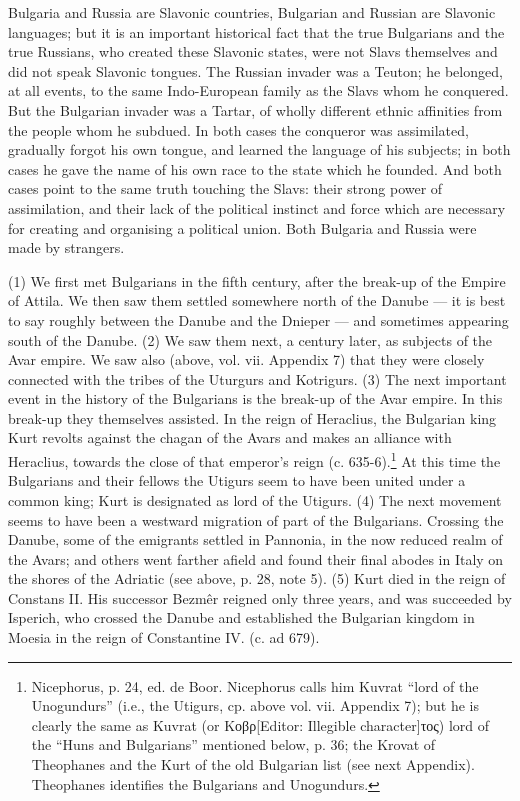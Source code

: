 
Bulgaria and Russia are Slavonic countries, Bulgarian and Russian are Slavonic languages; but it is an important historical fact that the true Bulgarians and the true Russians, who created these Slavonic states, were not Slavs themselves and did not speak Slavonic tongues. The Russian invader was a Teuton; he belonged, at all events, to the same Indo-European family as the Slavs whom he conquered. But the Bulgarian invader was a Tartar, of wholly different ethnic affinities from the people whom he subdued. In both cases the conqueror was assimilated, gradually forgot his own tongue, and learned the language of his subjects; in both cases he gave the name of his own race to the state which he founded. And both cases point to the same truth touching the Slavs: their strong power of assimilation, and their lack of the political instinct and force which are necessary for creating and organising a political union. Both Bulgaria and Russia were made by strangers.

(1) We first met Bulgarians in the fifth century, after the break-up of the Empire of Attila. We then saw them settled somewhere north of the Danube \texthebrew{—} it is best to say roughly between the Danube and the Dnieper \texthebrew{—} and sometimes appearing south of the Danube. (2) We saw them next, a century later, as subjects of the Avar empire. We saw also (above, vol. vii. Appendix 7) that they were closely connected with the tribes of the Uturgurs and Kotrigurs. (3) The next important event in the history of the Bulgarians is the break-up of the Avar empire. In this break-up they themselves assisted. In the reign of Heraclius, the Bulgarian king Kurt revolts against the chagan of the Avars and makes an alliance with Heraclius, towards the close of that emperor\texthebrew{}’s reign (c. 635-6).\footnote{Nicephorus, p. 24, ed. de Boor. Nicephorus calls him Kuvrat \texthebrew{“}lord of the Unogundurs\texthebrew{}” (i.e., the Utigurs, cp. above vol. vii. Appendix 7); but he is clearly the same as Kuvrat (or \textgreek{Κοβρ}[Editor: Illegible character]\textgreek{τος}) lord of the \texthebrew{“}Huns and Bulgarians\texthebrew{}” mentioned below, p. 36; the Krovat of Theophanes and the Kurt of the old Bulgarian list (see next Appendix). Theophanes identifies the Bulgarians and Unogundurs.} At this time the Bulgarians and their fellows the Utigurs seem to have been united under a common king; Kurt is designated as lord of the Utigurs. (4) The next movement seems to have been a westward migration of part of the Bulgarians. Crossing the Danube, some of the emigrants settled in Pannonia, in the now reduced realm of the Avars; and others went farther afield and found their final abodes in Italy on the shores of the Adriatic (see above, p. 28, note 5). (5) Kurt died in the reign of Constans II. His successor Bezmêr reigned only three years, and was succeeded by Isperich, who crossed the Danube and established the Bulgarian kingdom in Moesia in the reign of Constantine IV. (c. ad 679).

